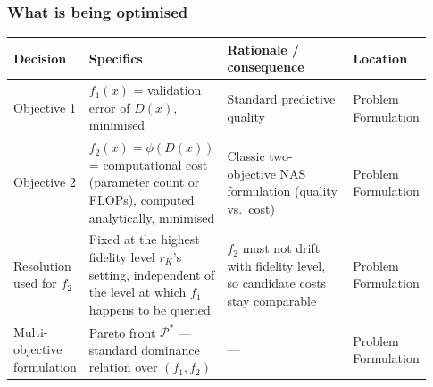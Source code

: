 \subsubsection*{What is being optimised}
\begin{longtable}{p{0.16\linewidth} p{0.28\linewidth} p{0.36\linewidth} p{0.13\linewidth}}
\toprule
\textbf{Decision} & \textbf{Specifics} & \textbf{Rationale / consequence} & \textbf{Location} \\
\midrule
\endhead
Objective 1 & $f_1(x)$ = validation error of $D(x)$, minimised & Standard predictive quality & Problem Formulation \\
Objective 2 & $f_2(x)=\phi(D(x))$ = computational cost (parameter count or FLOPs), computed analytically, minimised & Classic two-objective NAS formulation (quality vs.\ cost) & Problem Formulation \\
Resolution used for $f_2$ & Fixed at the highest fidelity level $r_K$'s setting, independent of the level at which $f_1$ happens to be queried & $f_2$ must not drift with fidelity level, so candidate costs stay comparable & Problem Formulation \\
Multi-objective formulation & Pareto front $\mathcal{P}^*$ --- standard dominance relation over $(f_1,f_2)$ & --- & Problem Formulation \\
\bottomrule
\end{longtable}

